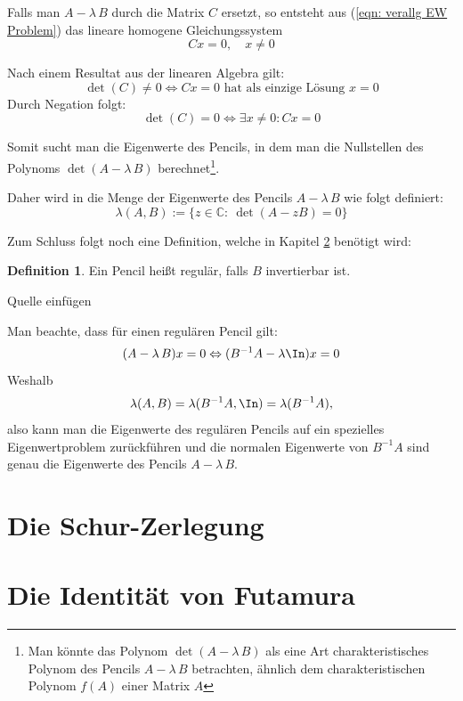 \documentclass[ngerman,BCOR=4mm]{tudscrreprt}
\newcommand{\C}{\mathbb C}
\newcommand{\AlamB}{A-\lambda\,B}
\theoremstyle{plain} %
\theoremstyle{definition} %
\newtheorem{definition}[theorem]{Definition}
\theoremstyle{remark}
\begin{document}
            Falls man $\AlamB$ durch die Matrix $C$ ersetzt, so entsteht aus (\ref{eqn: verallg EW Problem}) das lineare homogene Gleichungssystem
            $$Cx=0,\quad x\ne 0$$

            Nach einem Resultat aus der linearen Algebra gilt:
            $$\det(C)\ne 0 \Leftrightarrow Cx=0 \text{ hat als einzige Lösung }x=0$$
            Durch Negation folgt:
            $$\det(C)=0 \Leftrightarrow \exists x\ne 0: Cx=0$$

            Somit sucht man die Eigenwerte des Pencils, in dem man die Nullstellen des Polynoms $\det(\AlamB)$ berechnet\footnote{Man könnte das Polynom $\det(\AlamB)$ als eine Art charakteristisches Polynom des Pencils $\AlamB$ betrachten, ähnlich dem charakteristischen Polynom $f(A)$ einer Matrix $A$}.
            
            Daher wird in \cite[S. 375]{matrixGolub} die Menge der Eigenwerte des Pencils $\AlamB$ wie folgt definiert:
            \begin{equation}
                  \label{def: EW Pencil}
                  \lambda(A,B):=\{z\in\C:\ \det(A - zB) = 0\}
            \end{equation}

            Zum Schluss folgt noch eine Definition, welche in Kapitel \ref{sec: Futamura} benötigt wird:
            \begin{definition}
                  Ein Pencil heißt regulär, falls $B$ invertierbar ist.
            \end{definition}
Quelle einfügen

            Man beachte, dass für einen regulären Pencil gilt:
            $$(\AlamB)x = 0 \Leftrightarrow (B^{-1}A - \lambda \In)x = 0$$
            Weshalb $$\lambda(A,B) = \lambda(B^{-1}A,\In) = \lambda(B^{-1}A),$$
            also kann man die Eigenwerte des regulären Pencils auf ein spezielles Eigenwertproblem zurückführen und die normalen Eigenwerte von $B^{-1}A$ sind genau die Eigenwerte des Pencils $\AlamB$.
      \section{Die Schur-Zerlegung}
      
      \section{Die Identität von Futamura}
      \label{sec: Futamura}
\end{document}
